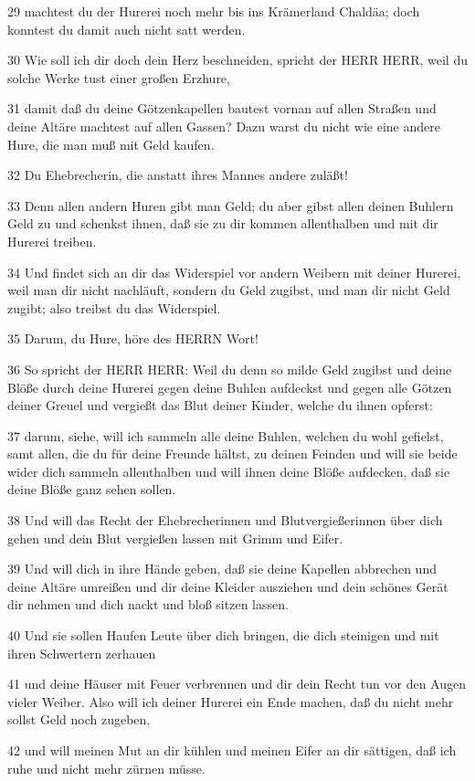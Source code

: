 \par 29 machtest du der Hurerei noch mehr bis ins Krämerland Chaldäa; doch konntest du damit auch nicht satt werden.
\par 30 Wie soll ich dir doch dein Herz beschneiden, spricht der HERR HERR, weil du solche Werke tust einer großen Erzhure,
\par 31 damit daß du deine Götzenkapellen bautest vornan auf allen Straßen und deine Altäre machtest auf allen Gassen? Dazu warst du nicht wie eine andere Hure, die man muß mit Geld kaufen.
\par 32 Du Ehebrecherin, die anstatt ihres Mannes andere zuläßt!
\par 33 Denn allen andern Huren gibt man Geld; du aber gibst allen deinen Buhlern Geld zu und schenkst ihnen, daß sie zu dir kommen allenthalben und mit dir Hurerei treiben.
\par 34 Und findet sich an dir das Widerspiel vor andern Weibern mit deiner Hurerei, weil man dir nicht nachläuft, sondern du Geld zugibst, und man dir nicht Geld zugibt; also treibst du das Widerspiel.
\par 35 Darum, du Hure, höre des HERRN Wort!
\par 36 So spricht der HERR HERR: Weil du denn so milde Geld zugibst und deine Blöße durch deine Hurerei gegen deine Buhlen aufdeckst und gegen alle Götzen deiner Greuel und vergießt das Blut deiner Kinder, welche du ihnen opferst:
\par 37 darum, siehe, will ich sammeln alle deine Buhlen, welchen du wohl gefielst, samt allen, die du für deine Freunde hältst, zu deinen Feinden und will sie beide wider dich sammeln allenthalben und will ihnen deine Blöße aufdecken, daß sie deine Blöße ganz sehen sollen.
\par 38 Und will das Recht der Ehebrecherinnen und Blutvergießerinnen über dich gehen und dein Blut vergießen lassen mit Grimm und Eifer.
\par 39 Und will dich in ihre Hände geben, daß sie deine Kapellen abbrechen und deine Altäre umreißen und dir deine Kleider ausziehen und dein schönes Gerät dir nehmen und dich nackt und bloß sitzen lassen.
\par 40 Und sie sollen Haufen Leute über dich bringen, die dich steinigen und mit ihren Schwertern zerhauen
\par 41 und deine Häuser mit Feuer verbrennen und dir dein Recht tun vor den Augen vieler Weiber. Also will ich deiner Hurerei ein Ende machen, daß du nicht mehr sollst Geld noch zugeben,
\par 42 und will meinen Mut an dir kühlen und meinen Eifer an dir sättigen, daß ich ruhe und nicht mehr zürnen müsse.
